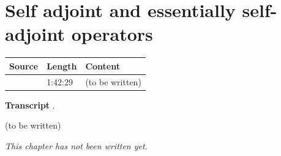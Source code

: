 \chapter{Self adjoint and essentially self-adjoint operators}\label{ch:c27}
\begin{paracol}{2}

\begin{sources}
\begin{tabularx}{\linewidth}{@{}l l L@{}}
\toprule
\textbf{Source} & \textbf{Length} & \textbf{Content}\\
\midrule
{} & 1:42:29 & (to be written)\\
\bottomrule
\end{tabularx}

\smallskip
\textbf{Transcript} .
\end{sources}

\begin{reading}
(to be written)
\end{reading}

\emph{This chapter has not been written yet.}

\flushside
\end{paracol}

